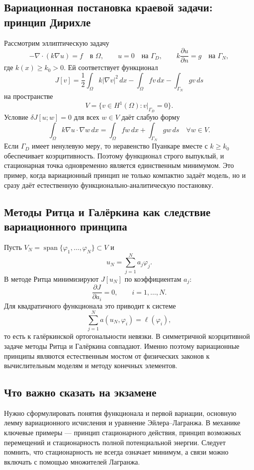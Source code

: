 \subsection{Вариационная постановка краевой задачи: принцип Дирихле}

Рассмотрим эллиптическую задачу
\[
    -\nabla\cdot(k\nabla u)=f\quad\text{в }\Omega,
    \qquad u=0\quad\text{на }\Gamma_D,
    \qquad k\frac{\partial u}{\partial n}=g\quad\text{на }\Gamma_N,
\]
где $k(x)\ge k_0>0$. Ей соответствует функционал
\[
    J[v]
    =\frac12\int_\Omega k|\nabla v|^2\,dx
     -\int_\Omega fv\,dx
     -\int_{\Gamma_N}gv\,ds
\]
на пространстве
\[
    V=\{v\in H^1(\Omega):v|_{\Gamma_D}=0\}.
\]
Условие $\delta J[u;w]=0$ для всех $w\in V$ даёт слабую форму
\[
    \boxed{
    \int_\Omega k\nabla u\cdot\nabla w\,dx
    =\int_\Omega fw\,dx+\int_{\Gamma_N}gw\,ds
    \quad\forall w\in V.
    }
\]
Если $\Gamma_D$ имеет ненулевую меру, то неравенство Пуанкаре вместе с
$k\ge k_0$ обеспечивает коэрцитивность. Поэтому функционал строго выпуклый,
и стационарная точка одновременно является единственным минимумом. Это пример,
когда вариационный принцип не только компактно задаёт модель, но и сразу даёт
естественную функционально-аналитическую постановку.

\subsection{Методы Ритца и Галёркина как следствие вариационного принципа}

Пусть $V_N=\operatorname{span}\{\varphi_1,\ldots,\varphi_N\}\subset V$ и
\[
    u_N=\sum_{j=1}^N a_j\varphi_j.
\]
В методе Ритца минимизируют $J[u_N]$ по коэффициентам $a_j$:
\[
    \frac{\partial J}{\partial a_i}=0,
    \qquad i=1,\ldots,N.
\]
Для квадратичного функционала это приводит к системе
\[
    \sum_{j=1}^N a(u_N,\varphi_i)=\ell(\varphi_i),
\]
то есть к галёркинской ортогональности невязки. В симметричной коэрцитивной
задаче методы Ритца и Галёркина совпадают. Именно поэтому вариационные принципы
являются естественным мостом от физических законов к вычислительным моделям и
методу конечных элементов.

\subsection{Что важно сказать на экзамене}

Нужно сформулировать понятия функционала и первой вариации, основную
лемму вариационного исчисления и уравнение Эйлера--Лагранжа. В механике
ключевые примеры --- принцип стационарного действия, принцип возможных
перемещений и стационарность полной потенциальной энергии. Следует
помнить, что стационарность не всегда означает минимум, а связи можно
включать с помощью множителей Лагранжа.

\newpage
